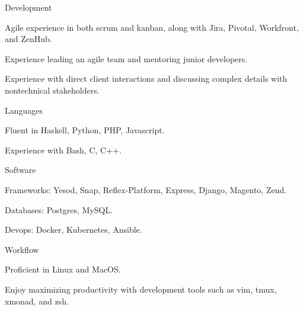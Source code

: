 \begin{cvskills}
  \cvskill
    {Development}
    {\begin{cvitems}
        \item Agile experience in both scrum and kanban, along with Jira, Pivotal, Workfront, and ZenHub.
        \item Experience leading an agile team and mentoring junior developers.
        \item Experience with direct client interactions and
          discussing complex details with nontechnical stakeholders.
     \end{cvitems}}
  \cvskill
    {Languages}
    {\begin{cvitems}
        \item Fluent in Haskell, Python, PHP, Javascript.
        \item Experience with Bash, C, C++.
     \end{cvitems}}
  \cvskill
    {Software}
    {\begin{cvitems}
        \item Frameworks: Yesod, Snap, Reflex-Platform, Express, Django, Magento, Zend.
        \item Databases: Postgres, MySQL.
        \item Devops: Docker, Kubernetes, Ansible.
     \end{cvitems}}
  \cvskill
    {Workflow}
    {\begin{cvitems}
        \item Proficient in Linux and MacOS.
        \item Enjoy maximizing productivity with development tools such as
          vim, tmux, xmonad, and zsh.
     \end{cvitems}}
\end{cvskills}
